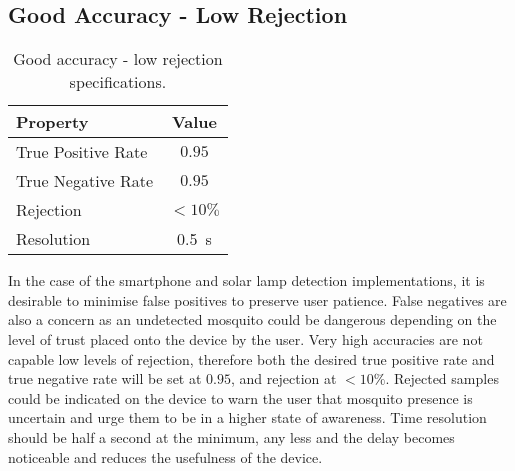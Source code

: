     \subsection{Good Accuracy - Low Rejection}
    \label{subsec:exp-spec-lowrej}
        \begin{wraptable}{r}{0.3\textwidth}
            \scriptsize
            \singlespacing
            \centering
                \begin{tabular}{ |l||c| } 
                    \hline
                    Property & Value \\ 
                    \hline
                    \hline
                    True Positive Rate & $0.95$ \\
                    True Negative Rate & $0.95$ \\
                    Rejection & $<10\%$ \\
                    Resolution & \SI{0.5}{\second}\\
                    \hline
                \end{tabular}
            \caption{Good accuracy - low rejection specifications.}
            \label{tbl:exp-spec-lowrej-tbl}
        \end{wraptable} 
        In the case of the smartphone and solar lamp detection implementations, it is desirable to minimise false positives to preserve user patience. False negatives are also a concern as an undetected mosquito could be dangerous depending on the level of trust placed onto the device by the user. Very high accuracies are not capable low levels of rejection, therefore both the desired true positive rate and true negative rate will be set at $0.95$, and rejection at $<10\%$. Rejected samples could be indicated on the device to warn the user that mosquito presence is uncertain and urge them to be in a higher state of awareness. Time resolution should be half a second at the minimum, any less and the delay becomes noticeable and reduces the usefulness of the device.
        
